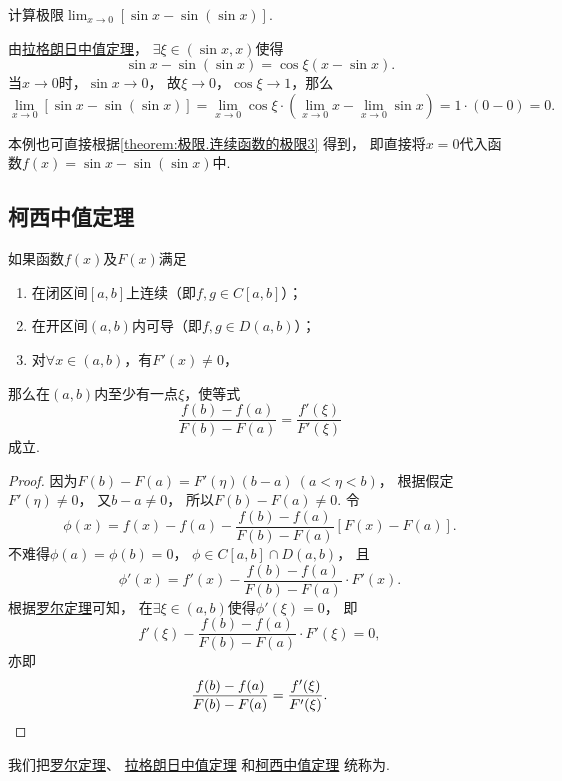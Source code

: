 \begin{example}
\def\l{\lim_{x\to0}}%
计算极限\(\l \left[\sin x - \sin(\sin x)\right]\).
\begin{solution}
由\hyperref[theorem:微分中值定理.拉格朗日中值定理]{拉格朗日中值定理}，
\(\exists\xi\in(\sin x,x)\)使得\[
	\sin x - \sin(\sin x)
	= \cos\xi (x-\sin x).
\]
当\(x\to0\)时，\(\sin x\to0\)，
故\(\xi\to0\)，\(\cos\xi\to1\)，那么\[
	\l \left[\sin x - \sin(\sin x)\right]
	= \l \cos\xi \cdot \left(\l x - \l \sin x\right)
	= 1 \cdot (0-0) = 0.
\]
\end{solution}
\end{example}
本例也可直接根据\cref{theorem:极限.连续函数的极限3} 得到，
即直接将\(x=0\)代入函数\(f(x) = \sin x - \sin(\sin x)\)中.

\subsection{柯西中值定理}
\begin{theorem}[柯西中值定理]\label{theorem:微分中值定理.柯西中值定理}
如果函数\(f(x)\)及\(F(x)\)满足
\begin{enumerate}
	\item 在闭区间\([a,b]\)上连续（即\(f,g \in C[a,b]\)）；
	\item 在开区间\((a,b)\)内可导（即\(f,g \in D(a,b)\)）；
	\item 对\(\forall x\in(a,b)\)，有\(F'(x) \neq 0\)，
\end{enumerate}
那么在\((a,b)\)内至少有一点\(\xi\)，使等式
\begin{equation}
\frac{f(b)-f(a)}{F(b)-F(a)}=\frac{f'(\xi)}{F'(\xi)}
\end{equation}
成立.
\begin{proof}
因为\(F(b)-F(a)=F'(\eta)(b-a)\ (a<\eta<b)\)，
根据假定\(F'(\eta)\neq0\)，
又\(b-a\neq0\)，
所以\(F(b)-F(a)\neq0\).
令\[
	\phi(x)=f(x)-f(a)-\frac{f(b)-f(a)}{F(b)-F(a)}[F(x)-F(a)].
\]
不难得\(\phi(a)=\phi(b)=0\)，
\(\phi\in C[a,b]\cap D(a,b)\)，
且\[
	\phi'(x)=f'(x)-\frac{f(b)-f(a)}{F(b)-F(a)}\cdot F'(x).
\]
根据\hyperref[theorem:微分中值定理.罗尔定理]{罗尔定理}可知，
在\(\exists\xi\in(a,b)\)使得\(\phi'(\xi)=0\)，
即\[
	f'(\xi)-\frac{f(b)-f(a)}{F(b)-F(a)}\cdot F'(\xi)=0,
\]
亦即\[
	\frac{f(b)-f(a)}{F(b)-F(a)}=\frac{f'(\xi)}{F'(\xi)}.
	\qedhere
\]
\end{proof}
\end{theorem}

我们把\hyperref[theorem:微分中值定理.罗尔定理]{罗尔定理}、
\hyperref[theorem:微分中值定理.拉格朗日中值定理]{拉格朗日中值定理}%
和\hyperref[theorem:微分中值定理.柯西中值定理]{柯西中值定理}%
统称为.

